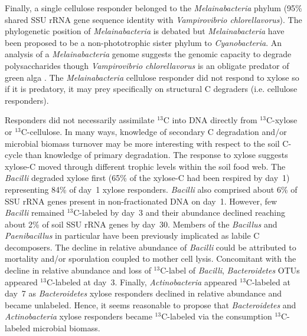 Finally, a single cellulose responder belonged to the \textit{Melainabacteria}
phylum (95\% shared SSU rRNA gene sequence identity with \textit{Vampirovibrio
chlorellavorus}). The phylogenetic position of \textit{Melainabacteria} is
debated but \textit{Melainabacteria} have been proposed to be
a non-phototrophic sister phylum to \textit{Cyanobacteria}. An analysis of
a \textit{Melainabacteria} genome \citep{Di_Rienzi_2013} suggests the
genomic capacity to degrade polysaccharides though \textit{Vampirovibrio
chlorellavorus} is an obligate predator of green alga \citep{gromov_1972}. The
\textit{Melainabacteria} cellulose responder did not respond to xylose so if it
is predatory, it may prey specifically on structural C degraders (i.e.
cellulose responders).

Responders did not necessarily assimilate $^{13}$C into DNA directly
from $^{13}$C-xylose or $^{13}$C-cellulose. In many ways, knowledge of
secondary C degradation and/or microbial biomass turnover may be more
interesting with respect to the soil C-cycle than knowledge of primary
degradation. The response to xylose suggests xylose-C moved through different
trophic levels within the soil food web. The \textit{Bacilli} degraded xylose
first (65\% of the xylose-C had been respired by day~1) representing 84\% of
day~1 xylose responders. \textit{Bacilli} also comprised about 6\% of SSU rRNA
genes present in non-fractionated DNA on day~1. However, few \textit{Bacilli}
remained $^{13}$C-labeled by day~3 and their abundance declined reaching about
2\% of soil SSU rRNA genes by day~30. Members of the \textit{Bacillus}
\citep{Cleveland2007} and \textit{Paenibacillus} in particular
\citep{Verastegui_2014} have been previously implicated as labile
C decomposers. The decline in relative abundance of \textit{Bacilli} could be
attributed to mortality and/or sporulation coupled to mother cell lysis.
Concomitant with the decline in relative abundance and loss of $^{13}$C-label
of \textit{Bacilli}, \textit{Bacteroidetes} OTUs appeared $^{13}$C-labeled at
day~3. Finally, \textit{Actinobacteria} appeared $^{13}$C-labeled at day~7 as
\textit{Bacteroidetes} xylose responders declined in relative abundance and
became unlabeled. Hence, it seems reasonable to propose that
\textit{Bacteroidetes} and \textit{Actinobacteria} xylose responders became
$^{13}$C-labeled via the consumption $^{13}$C-labeled microbial biomass. 

